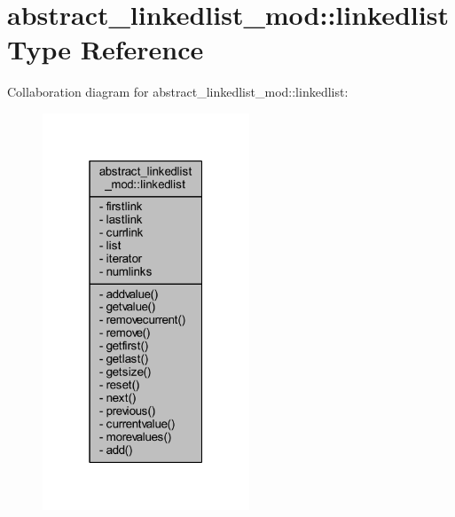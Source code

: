 \hypertarget{structabstract__linkedlist__mod_1_1linkedlist}{}\section{abstract\+\_\+linkedlist\+\_\+mod\+:\+:linkedlist Type Reference}
\label{structabstract__linkedlist__mod_1_1linkedlist}


Collaboration diagram for abstract\+\_\+linkedlist\+\_\+mod\+:\+:linkedlist\+:
\nopagebreak
\begin{figure}[H]
\begin{center}
\leavevmode
\includegraphics[width=175pt]{structabstract__linkedlist__mod_1_1linkedlist__coll__graph}
\end{center}
\end{figure}
